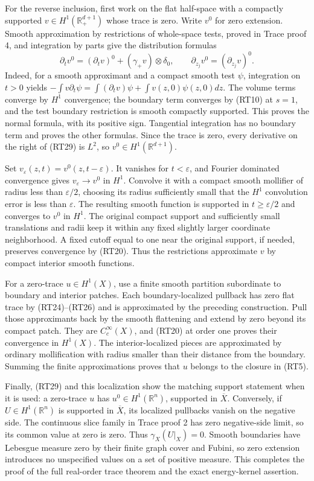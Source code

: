 \documentclass[
  11pt,
]{article}
\begin{document}
For the reverse inclusion, first work on the flat half-space with a
compactly supported \(v\in H^1(\mathbb R^{d+1}_+)\) whose trace is zero.
Write \(v^0\) for zero extension. Smooth approximation by restrictions
of whole-space tests, proved in Trace proof 4, and integration by parts
give the distribution formulas \[
 \partial_t v^0=(\partial_t v)^0+(\gamma_+v)\otimes\delta_0,
 \qquad
 \partial_{z_j}v^0=(\partial_{z_j}v)^0.
 \tag{RT29}
\] Indeed, for a smooth approximant and a compact smooth test \(\psi\),
integration on \(t>0\) yields
\(-\int v\partial_t\psi=\int(\partial_tv)\psi+\int v(z,0)\psi(z,0)dz\).
The volume terms converge by \(H^1\) convergence; the boundary term
converges by (RT10) at \(s=1\), and the test boundary restriction is
smooth compactly supported. This proves the normal formula, with its
positive sign. Tangential integration has no boundary term and proves
the other formulas. Since the trace is zero, every derivative on the
right of (RT29) is \(L^2\), so \(v^0\in H^1(\mathbb R^{d+1})\).

Set \(v_\varepsilon(z,t)=v^0(z,t-\varepsilon)\). It vanishes for
\(t<\varepsilon\), and Fourier dominated convergence gives
\(v_\varepsilon\to v^0\) in \(H^1\). Convolve it with a compact smooth
mollifier of radius less than \(\varepsilon/2\), choosing its radius
sufficiently small that the \(H^1\) convolution error is less than
\(\varepsilon\). The resulting smooth function is supported in
\(t\geq\varepsilon/2\) and converges to \(v^0\) in \(H^1\). The original
compact support and sufficiently small translations and radii keep it
within any fixed slightly larger coordinate neighborhood. A fixed cutoff
equal to one near the original support, if needed, preserves convergence
by (RT20). Thus the restrictions approximate \(v\) by compact interior
smooth functions.

For a zero-trace \(u\in H^1(X)\), use a finite smooth partition
subordinate to boundary and interior patches. Each boundary-localized
pullback has zero flat trace by (RT24)--(RT26) and is approximated by
the preceding construction. Pull those approximants back by the smooth
flattening and extend by zero beyond its compact patch. They are
\(C_c^\infty(X)\), and (RT20) at order one proves their convergence in
\(H^1(X)\). The interior-localized pieces are approximated by ordinary
mollification with radius smaller than their distance from the boundary.
Summing the finite approximations proves that \(u\) belongs to the
closure in (RT5).

Finally, (RT29) and this localization show the matching support
statement when it is used: a zero-trace \(u\) has
\(u^0\in H^1(\mathbb R^n)\), supported in \(\overline X\). Conversely,
if \(U\in H^1(\mathbb R^n)\) is supported in \(\overline X\), its
localized pullbacks vanish on the negative side. The continuous slice
family in Trace proof 2 has zero negative-side limit, so its common
value at zero is zero. Thus \(\gamma_X(U|_X)=0\). Smooth boundaries have
Lebesgue measure zero by their finite graph cover and Fubini, so zero
extension introduces no unspecified values on a set of positive measure.
This completes the proof of the full real-order trace theorem and the
exact energy-kernel assertion.
\end{document}
